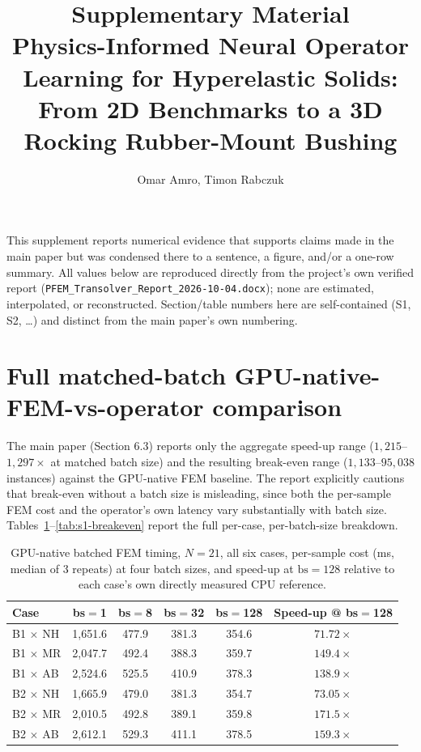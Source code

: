 \documentclass[11pt]{article}
\title{Supplementary Material\\[4pt]\large Physics-Informed Neural Operator Learning for Hyperelastic Solids: From 2D Benchmarks to a 3D Rocking Rubber-Mount Bushing}
\author{Omar Amro, Timon Rabczuk}
\date{}
\begin{document}
\maketitle

\noindent This supplement reports numerical evidence that supports claims
made in the main paper but was condensed there to a sentence, a figure,
and/or a one-row summary. All values below are reproduced directly from
the project's own verified report
(\texttt{PFEM\_Transolver\_Report\_2026-10-04.docx}); none are estimated,
interpolated, or reconstructed. Section/table numbers here are
self-contained (S1, S2, \ldots) and distinct from the main paper's own
numbering.

\section{Full matched-batch GPU-native-FEM-vs-operator comparison}
\label{sec:s1}
The main paper (Section 6.3) reports only the aggregate speed-up range
($1{,}215$--$1{,}297\times$ at matched batch size) and the resulting
break-even range ($1{,}133$--$95{,}038$ instances) against the GPU-native
FEM baseline. The report explicitly cautions that break-even without a
batch size is misleading, since both the per-sample FEM cost and the
operator's own latency vary substantially with batch size. Tables~\ref{tab:s1-fem}--\ref{tab:s1-breakeven}
report the full per-case, per-batch-size breakdown.

\begin{table}[h]
\centering
\caption{GPU-native batched FEM timing, $N{=}21$, all six cases,
  per-sample cost (ms, median of 3 repeats) at four batch sizes, and
  speed-up at $\mathrm{bs}{=}128$ relative to each case's own directly
  measured CPU reference.}
\label{tab:s1-fem}
\small
\begin{tabular}{lccccc}
\toprule
Case & bs$=$1 & bs$=$8 & bs$=$32 & bs$=$128 & Speed-up @ bs$=$128 \\
\midrule
B1 $\times$ NH & 1{,}651.6 & 477.9 & 381.3 & 354.6 & $71.72\times$ \\
B1 $\times$ MR & 2{,}047.7 & 492.4 & 388.3 & 359.7 & $149.4\times$ \\
B1 $\times$ AB & 2{,}524.6 & 525.5 & 410.9 & 378.3 & $138.9\times$ \\
B2 $\times$ NH & 1{,}665.9 & 479.0 & 381.3 & 354.7 & $73.05\times$ \\
B2 $\times$ MR & 2{,}010.5 & 492.8 & 389.1 & 359.8 & $171.5\times$ \\
B2 $\times$ AB & 2{,}612.1 & 529.3 & 411.1 & 378.5 & $159.3\times$ \\
\bottomrule
\end{tabular}
\end{table}
\end{document}

